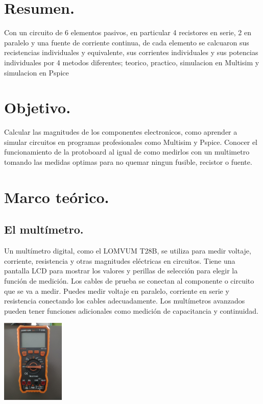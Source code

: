 \documentclass[10pt]{article}
\begin{document}
\section{Resumen.}
Con un circuito de 6 elementos pasivos, en particular 4 recistores en serie, 2 en paralelo y una fuente de corriente continua,  de cada elemento se calcuaron sus recistencias individuales y equivalente, sus corrientes individuales y sus potencias individuales por 4 metodos diferentes; teorico, practico, simulacion en Multisim y simulacion en Pspice 

\begin{multicols}{2}

\section{Objetivo.}
Calcular las magnitudes de los componentes electronicos, como aprender a simular circuitos en programas profesionales como Multisim y Pspice. Conocer el funcionamiento de la protoboard al igual de como medirlos con un multimetro tomando las medidas optimas para no quemar ningun fusible, recistor o fuente.



\section{Marco teórico.}

\subsection{El multímetro.}
Un multímetro digital, como el LOMVUM T28B, se utiliza para medir voltaje, corriente, resistencia y otras magnitudes eléctricas en circuitos. Tiene una pantalla LCD para mostrar los valores y perillas de selección para elegir la función de medición. Los cables de prueba se conectan al componente o circuito que se va a medir. Puedes medir voltaje en paralelo, corriente en serie y resistencia conectando los cables adecuadamente. Los multímetros avanzados pueden tener funciones adicionales como medición de capacitancia y continuidad. 
	\begin{center}
		\includegraphics[width=3cm, height=4cm]{Imagenes/Multimetro.jpeg}
		

\end{center}
\end{multicols}
\end{document}
